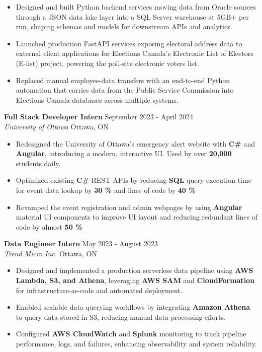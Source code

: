 \documentclass[a4paper]{article}
\begin{document}
\begin{itemize}
\item Designed and built Python backend services moving data from Oracle sources through a JSON data lake layer into a SQL Server warehouse at 5GB+ per run, shaping schemas and models for downstream APIs and analytics.

\item Launched production FastAPI services exposing electoral address data to external client applications for Elections Canada's Electronic List of Electors (E-list) project, powering the poll-site electronic voters list.

\item Replaced manual employee-data transfers with an end-to-end Python automation that carries data from the Public Service Commission into Elections Canada databases across multiple systems.

\end{itemize}

\textbf{Full Stack Developer Intern } \hfill September 2023 - April 2024\\
\textit{University of Ottawa} \hfill Ottawa, ON\\
\vspace{-2mm}
\begin{itemize} \itemsep -4pt
    \item Redesigned the University of Ottawa's emergency alert website with \textbf{C\#} and \textbf{Angular}, introducing a modern, interactive UI. Used by over \textbf{20,000} students daily.
     \item Optimized existing \textbf{C\#} REST APIs by reducing \textbf{SQL} query execution time for event data lookup by \textbf{30 \%} and lines of code by \textbf{40 \%}
    \item Revamped the event registration and admin webpages by using \textbf{Angular} material UI components to improve UI layout and reducing redundant lines of code by almost \textbf{50 \%}
\end{itemize}

\textbf{Data Engineer Intern} \hfill May 2023 - August 2023\\
\textit{Trend Micro Inc.} \hfill Ottawa, ON\\
\vspace{-2mm}
\begin{itemize} \itemsep -4pt

\item Designed and implemented a production serverless data pipeline using \textbf{AWS Lambda, S3, and Athena}, leveraging \textbf{AWS SAM} and \textbf{CloudFormation} for infrastructure-as-code and automated deployment.

\item Enabled scalable data querying workflows by integrating \textbf{Amazon Athena} to query data stored in S3, reducing manual data processing efforts.

\item Configured \textbf{AWS CloudWatch} and \textbf{Splunk} monitoring to track pipeline performance, logs, and failures, enhancing observability and system reliability.

\end{itemize}
\end{document}
